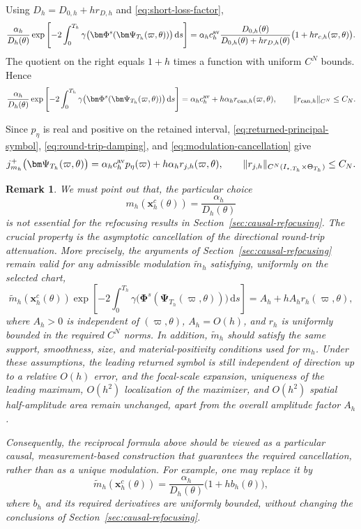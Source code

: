 \documentclass[11pt,reqno]{amsart}
\newtheorem{remark}{Remark}[section]
\newcommand{\dd}{\,\mathrm{d}}
\numberwithin{equation}{section}
\begin{document}
Using $D_h=D_{0,h}+h r_{D,h}$ and \eqref{eq:short-loss-factor},
\begin{equation*}
 \frac{\alpha_h}{D_h(\theta)}\exp\left[-2\int_0^{T_h}\gamma\bigl(\bm\Phi^s(\bm\Psi_{T_h}(\varpi,\theta))\bigr)\dd s\right]=\alpha_hc_h^{\rm av}\frac{D_{0,h}(\theta)}{D_{0,h}(\theta)+h r_{D,h}(\theta)}\bigl(1+h r_{c,h}(\varpi,\theta)\bigr).
\end{equation*}
The quotient on the right equals $1+h$ times a function with uniform $C^N$ bounds. Hence
\begin{equation}\label{eq:modulation-cancellation}
 \frac{\alpha_h}{D_h(\theta)}\exp\left[-2\int_0^{T_h}\gamma\bigl(\bm\Phi^s(\bm\Psi_{T_h}(\varpi,\theta))\bigr)\dd s\right]
 =\alpha_h c_h^{\rm av}+h\alpha_h r_{{\rm can},h}(\varpi,\theta), \qquad \|r_{{\rm can},h}\|_{C^N}\le C_N.
\end{equation}

Since $p_\eta$ is real and positive on the retained interval, \eqref{eq:returned-principal-symbol}, \eqref{eq:round-trip-damping}, and \eqref{eq:modulation-cancellation} give
\begin{equation}\label{eq:returned-symbol}
 j_{m_h}^+\bigl(\bm\Psi_{T_h}(\varpi,\theta)\bigr)
 =\alpha_h c_h^{\rm av}p_\eta(\varpi)+h\alpha_h r_{j,h}(\varpi,\theta), \qquad \|r_{j,h}\|_{C^N(I_{\star,T_h}\times\Theta_{T_h})}\le C_N.
\end{equation}

\begin{remark}
We must point out that, the particular choice
$$
m_h(\bm x_h^c(\theta))=\frac{\alpha_h}{D_h(\theta)}
$$
is not essential for the refocusing results in Section~\ref{sec:causal-refocusing}. The crucial property is the asymptotic cancellation of the directional round-trip attenuation. More precisely, the arguments of Section~\ref{sec:causal-refocusing} remain valid for any admissible modulation $\widetilde m_h$ satisfying, uniformly on the selected chart,
$$
\widetilde m_h(\bm x_h^c(\theta))\exp\left[-2\int_0^{T_h}\gamma\bigl(\bm\Phi^s(\bm\Psi_{T_h}(\varpi,\theta))\bigr)\dd s\right]=A_h+hA_h r_h(\varpi,\theta),
$$
where $A_h>0$ is independent of $(\varpi,\theta)$, $A_h= O(h)$, and $r_h$ is uniformly bounded in the required $C^N$ norms. In addition, $\widetilde m_h$ should satisfy the same support, smoothness, size, and material-positivity conditions used for $m_h$. Under these assumptions, the leading returned symbol is still independent of direction up to a relative $O(h)$ error, and the focal-scale expansion, uniqueness of the leading maximum, $O(h^2)$ localization of the maximizer, and $O(h^2)$ spatial half-amplitude area remain unchanged, apart from the overall amplitude factor $A_h$.

Consequently, the reciprocal formula above should be viewed as a particular causal, measurement-based construction that guarantees the required cancellation, rather than as a unique modulation. For example, one may replace it by
$$
\widetilde m_h(\bm x_h^c(\theta))=\frac{\alpha_h}{D_h(\theta)}\bigl(1+h b_h(\theta)\bigr),
$$
where $b_h$ and its required derivatives are uniformly bounded, without changing the conclusions of Section~\ref{sec:causal-refocusing}.
\end{remark}
\end{document}
